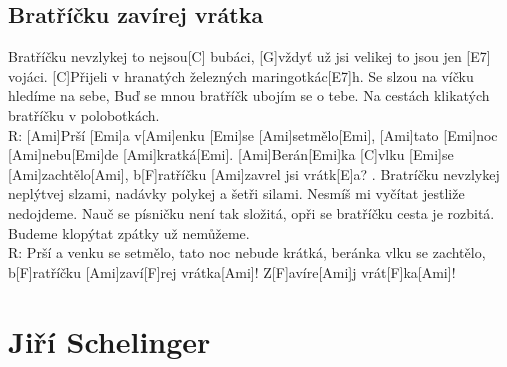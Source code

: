 \documentclass[10pt]{article}
\begin{document}
\begin{Large}
\begin{minipage}{\textwidth}
\subsection{Bratříčku zavírej vrátka}
\begin{multicols}{2}
\begin{guitar}
	[Ami]Bratříčku nevzlykej to nejsou[C] bubáci,
	[G]vždyť už jsi velikej to jsou jen [E7] vojáci.
	[C]Přijeli v hranatých železných maringotkác[E7]h.
	Se slzou na víčku hledíme na sebe,
	Buď se mnou bratříčk ubojím se o tebe. 
	Na cestách klikatých bratříčku v 
	polobotkách.
	\\
	R: [Ami]Prší [Emi]a v[Ami]enku [Emi]se [Ami]setmělo[Emi],
	[Ami]tato [Emi]noc [Ami]nebu[Emi]de [Ami]kratká[Emi].
	[Ami]Berán[Emi]ka [C]vlku [Emi]se [Ami]zachtělo[Ami], 
	b[F]ratříčku [Ami]zavrel jsi vrátk[E]a?
	. Bratríčku nevzlykej neplýtvej slzami,
	nadávky polykej a šetři silami.
	Nesmíš mi vyčítat jestliže nedojdeme.
	Nauč se písničku není tak složitá,
	opři se bratříčku cesta je rozbitá.
	Budeme klopýtat zpátky už nemůžeme.
	\\
	R: Prší a venku se setmělo, 
	tato noc nebude krátká, 
	beránka vlku se zachtělo, 
	b[F]ratříčku [Ami]zaví[F]rej vrátka[Ami]!
	Z[F]avíre[Ami]j vrát[F]ka[Ami]!
\end{guitar}
\end{multicols}
\end{minipage}

\section{Jiří Schelinger}

\begin{minipage}{\textwidth}

\end{minipage}
\end{Large}
\end{document}
